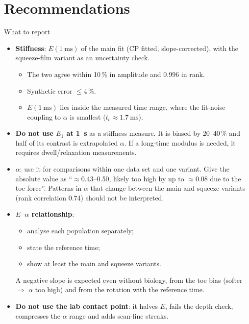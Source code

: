\documentclass[aspectratio=169,9pt]{beamer}
\begin{document}
\section{Recommendations}

\begin{frame}{What to report}
\footnotesize
\begin{itemize}
\item \textbf{Stiffness}: $E(\SI{1}{\milli\second})$ of the main fit (CP fitted, slope-corrected), with the squeeze-film variant as an uncertainty check.
 \begin{itemize}
 \item The two agree within 10\,\% in amplitude and 0.996 in rank.
 \item Synthetic error $\le4\,\%$.
 \item $E(\SI{1}{\milli\second})$ lies inside the measured time range, where the fit-noise coupling to $\alpha$ is smallest ($t_c\approx\SI{1.7}{\milli\second}$).
 \end{itemize}
\item \textbf{Do not use $E_1$ at \SI{1}{\second}} as a stiffness measure. It is biased by 20--40\,\% and half of its contrast is extrapolated $\alpha$. If a long-time modulus is needed, it requires dwell/relaxation measurements.
\item \textbf{$\alpha$}: use it for comparisons within one data set and one variant. Give the absolute value as ``$\approx0.43$--0.50, likely too high by up to $\approx0.08$ due to the toe force''. Patterns in $\alpha$ that change between the main and squeeze variants (rank correlation 0.74) should not be interpreted.
\item \textbf{$E$--$\alpha$ relationship}:
 \begin{itemize}
 \item analyse each population separately;
 \item state the reference time;
 \item show at least the main and squeeze variants.
 \end{itemize}
 A negative slope is expected even without biology, from the toe bias (softer $\Rightarrow$ $\alpha$ too high) and from the rotation with the reference time.
\item \textbf{Do not use the lab contact point}: it halves $E$, fails the depth check, compresses the $\alpha$ range and adds scan-line streaks.
\end{itemize}
\end{frame}
\end{document}
